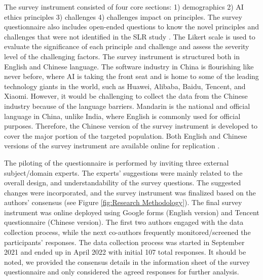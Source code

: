 The survey instrument consisted of four core sections: 1) demographics 2) AI ethics principles 3) challenges 4) challenges impact on principles. The survey questionnaire also includes open-ended questions to know the novel principles and challenges that were not identified in the SLR study \cite{AR13}. The Likert scale is used to evaluate the significance of each principle and challenge and assess the severity level of the challenging factors. The survey instrument is structured both in English and Chinese language. The software industry in China is flourishing like never before, where AI is taking the front seat and is home to some of the leading technology giants in the world, such as Huawei, Alibaba, Baidu, Tencent, and Xiaomi. However, it would be challenging to collect the data from the Chinese industry because of the language barriers. Mandarin is the national and official language in China, unlike India, where English is commonly used for official purposes. Therefore, the Chinese version of the survey instrument is developed to cover the major portion of the targeted population. Both English and Chinese versions of the survey instrument are available online for replication \cite{replication}. 

The piloting of the questionnaire is performed by inviting three external subject/domain experts. The experts' suggestions were mainly related to the overall design, and understandability of the survey questions. The suggested changes were incorporated, and the survey instrument was finalized based on the authors' consensus (see Figure \ref{fig:Research Methodology}). The final survey instrument was online deployed using Google forms (English version) and Tencent questionnaire (Chinese version). The first two authors engaged with the data collection process, while the next co-authors frequently monitored/screened the participants' responses. The data collection process was started in September 2021 and ended up in April 2022 with initial 107 total responses. It should be noted, we provided the consensus details in the information sheet of the survey questionnaire \cite{replication} and only considered the agreed responses for further analysis. 

